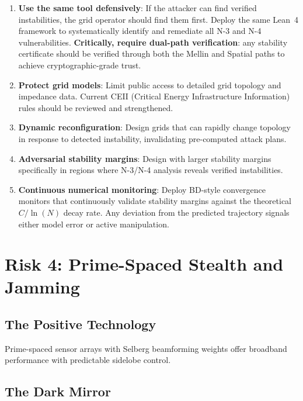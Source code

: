 \documentclass[11pt,a4paper]{article}
\begin{document}
\begin{enumerate}
  \item \textbf{Use the same tool defensively}: If the attacker can
    find verified instabilities, the grid operator should find them
    first. Deploy the same Lean~4 framework to systematically
    identify and remediate all N-3 and N-4 vulnerabilities.
    \textbf{Critically, require dual-path verification}: any
    stability certificate should be verified through both the Mellin
    and Spatial paths to achieve cryptographic-grade trust.
  \item \textbf{Protect grid models}: Limit public access to
    detailed grid topology and impedance data. Current CEII
    (Critical Energy Infrastructure Information) rules should be
    reviewed and strengthened.
  \item \textbf{Dynamic reconfiguration}: Design grids that can
    rapidly change topology in response to detected instability,
    invalidating pre-computed attack plans.
  \item \textbf{Adversarial stability margins}: Design with larger
    stability margins specifically in regions where N-3/N-4
    analysis reveals verified instabilities.
  \item \textbf{Continuous numerical monitoring}: Deploy BD-style
    convergence monitors that continuously validate stability
    margins against the theoretical $C/\ln(N)$ decay rate. Any
    deviation from the predicted trajectory signals either model
    error or active manipulation.
\end{enumerate}

\section{Risk 4: Prime-Spaced Stealth and Jamming}
\label{sec:stealth}

\subsection{The Positive Technology}

Prime-spaced sensor arrays with Selberg beamforming weights offer
broadband performance with predictable sidelobe control.

\subsection{The Dark Mirror}
\end{document}
